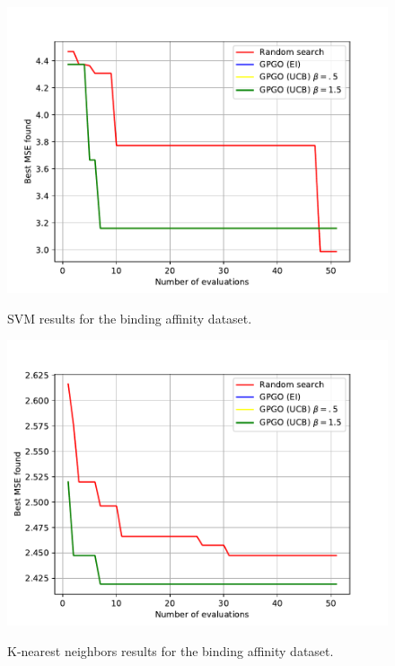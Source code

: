 \documentclass[10pt,a4paper,twoside]{book}
\begin{document}
\begin{figure}
\centering
\caption{SVM results for the binding affinity dataset.}
\includegraphics[scale=0.75]{figures/chapter4/aff/svm}
\label{fig:affsvm}
\end{figure}

\begin{figure}
\centering
\caption{K-nearest neighbors results for the binding affinity dataset.}
\includegraphics[scale=0.75]{figures/chapter4/aff/knn}
\label{fig:affknn}
\end{figure}
\end{document}
